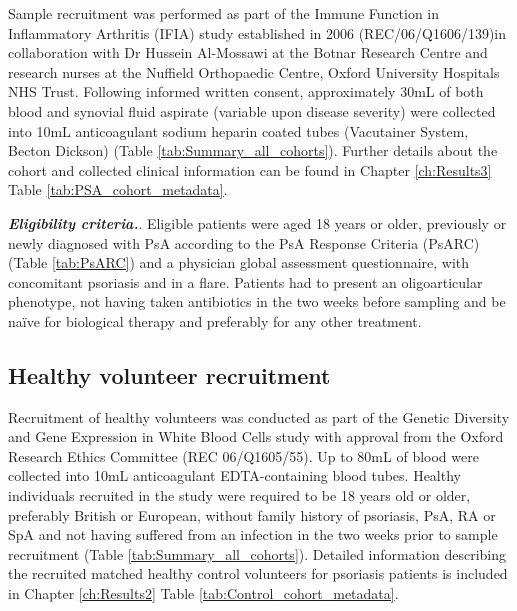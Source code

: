 Sample recruitment was performed as part of the Immune Function in Inflammatory Arthritis (IFIA) study established in 2006 (REC/06/Q1606/139)in collaboration with Dr Hussein Al-Mossawi at the Botnar Research Centre and research nurses at the Nuffield Orthopaedic Centre, Oxford University Hospitals NHS Trust. Following informed written consent, approximately 30mL of both blood and synovial fluid aspirate (variable upon disease severity) were collected into 10mL anticoagulant sodium heparin coated tubes (Vacutainer System, Becton Dickson) (Table \ref{tab:Summary_all_cohorts}). Further details about the cohort and collected clinical information can be found in Chapter \ref{ch:Results3} Table \ref{tab:PSA_cohort_metadata}.

\textbf{\textit{Eligibility criteria.}}. Eligible patients were aged 18 years or older, previously or newly diagnosed with PsA according to the PsA Response Criteria (PsARC) (Table \ref{tab:PsARC}) and a physician global assessment questionnaire, with concomitant psoriasis and in a flare. Patients had to present an oligoarticular phenotype, not having taken antibiotics in the two weeks before sampling and be na\"{i}ve for biological therapy and preferably for any other treatment.    


\subsection{Healthy volunteer recruitment}
Recruitment of healthy volunteers was conducted as part of the Genetic Diversity and Gene Expression in White Blood Cells study with approval from the Oxford Research Ethics Committee (REC 06/Q1605/55). Up to 80mL of blood were collected into 10mL anticoagulant EDTA-containing blood tubes. Healthy individuals recruited in the study were required to be 18 years old or older, preferably British or European, without family history of psoriasis, PsA, RA or SpA and not having suffered from an infection in the two weeks prior to sample recruitment (Table \ref{tab:Summary_all_cohorts}). Detailed information describing the recruited matched healthy control volunteers for psoriasis patients is included in Chapter \ref{ch:Results2} Table \ref{tab:Control_cohort_metadata}.


